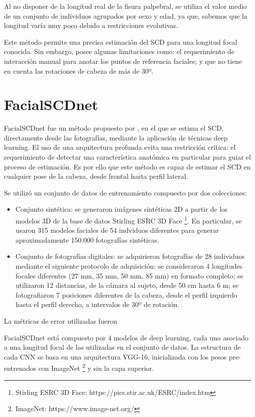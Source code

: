 Al no disponer de la longitud real de la fisura palpebral, se utiliza el valor medio de un conjunto de individuos agrupados por sexo y edad, ya que, sabemos que la longitud varía muy poco debido a restricciones evolutivas.

Este método permite una precisa estimación del SCD para una longitud focal conocida. Sin embargo, posee algunas limitaciones como: el requerimiento de interacción manual para anotar los puntos de referencia faciales; y que no tiene en cuenta las rotaciones de cabeza de más de 30º.

\section{FacialSCDnet}

FacialSCDnet fue un método propuesto por \cite{14}, en el que se estima el SCD, directamente desde las fotografías, mediante la aplicación de técnicas deep learning. El uso de una arquitectura profunda evita una restricción crítica: el requerimiento de detectar una característica anatómica en particular para guiar el proceso de estimación. Es por ello que este método es capaz de estimar el SCD en cualquier pose de la cabeza, desde frontal hasta perfil lateral.

Se utilizó un conjunto de datos de entrenamiento compuesto por dos colecciones: 

\begin{itemize}
	\item Conjunto sintética: se generaron imágenes sintéticas 2D a partir de los modelos 3D de la base de datos Stirling ESRC 3D Face \footnote{Stirling ESRC 3D Face: https://pics.stir.ac.uk/ESRC/index.htm}. En particular, se usaron 315 modelos faciales de 54 indviduos diferentes para generar aproximadamente 150.000 fotografías sintéticas.
	\item Conjunto de fotografías digitales: se adquirieron fotografías de 28 individuos mediante el siguiente protocolo de adquisición: se consideraron 4 longitudes focales diferentes (27 mm, 35 mm, 50 mm, 85 mm) en formato completo; se utilizaron 12 distancias, de la cámara al sujeto, desde 50 cm hasta 6 m; se fotografiaron 7 posiciones diferentes de la cabeza, desde el perfil izquierdo hasta el perfil derecho, a intervalos de 30º de rotación.
\end{itemize}

La métricas de error utilizadas fueron


FacialSCDnet está compuesto por 4 modelos de deep learning, cada uno asociado a una longitud focal de las utilizadas en el conjunto de datos. La estructura de cada CNN se basa en una arquitectura VGG-16, inicializada con los pesos pre-entrenados con ImageNet \footnote{ImageNet: https://www.image-net.org/} y sin la capa superior.




